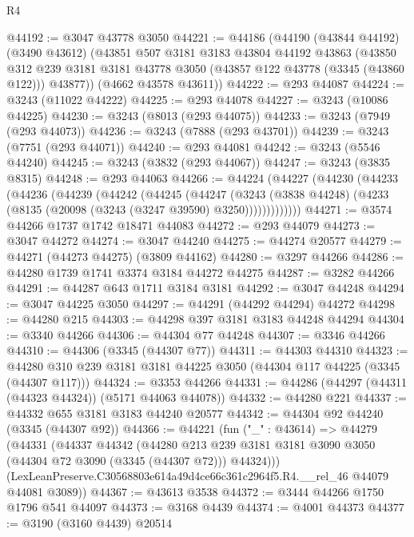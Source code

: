 \begin{lexlean}{R4}
\begin{coremodule}
@44192 := @3047 @43778 @3050
@44221 := @44186
    (@44190
      (@43844 @44192)
      (@3490 @43612)
      (@43851
        @507
        @3181
        @3183
        @43804
        @44192
        @43863
        (@43850
          @312
          @239
          @3181
          @3181
          @43778
          @3050
          (@43857 @122 @43778 (@3345 (@43860 @122)))
          @43877))
      (@4662 @43578 @43611))
@44222 := @293 @44087
@44224 := @3243 (@11022 @44222)
@44225 := @293 @44078
@44227 := @3243 (@10086 @44225)
@44230 := @3243 (@8013 (@293 @44075))
@44233 := @3243 (@7949 (@293 @44073))
@44236 := @3243 (@7888 (@293 @43701))
@44239 := @3243 (@7751 (@293 @44071))
@44240 := @293 @44081
@44242 := @3243 (@5546 @44240)
@44245 := @3243 (@3832 (@293 @44067))
@44247 := @3243 (@3835 @8315)
@44248 := @293 @44063
@44266 := @44224
    (@44227
      (@44230
        (@44233
          (@44236
            (@44239
              (@44242
                (@44245
                  (@44247
                    (@3243
                      (@3838 @44248)
                      (@4233 (@8135 (@20098 (@3243 (@3247 @39590) @3250)))))))))))))
@44271 := @3574 @44266 @1737 @1742 @18471 @44083
@44272 := @293 @44079
@44273 := @3047 @44272
@44274 := @3047 @44240
@44275 := @44274 @20577
@44279 := @44271 (@44273 @44275) (@3809 @44162)
@44280 := @3297 @44266
@44286 := @44280 @1739 @1741 @3374 @3184 @44272 @44275
@44287 := @3282 @44266
@44291 := @44287 @643 @1711 @3184 @3181
@44292 := @3047 @44248
@44294 := @3047 @44225 @3050
@44297 := @44291 (@44292 @44294) @44272
@44298 := @44280 @215
@44303 := @44298 @397 @3181 @3183 @44248 @44294
@44304 := @3340 @44266
@44306 := @44304 @77 @44248
@44307 := @3346 @44266
@44310 := @44306 (@3345 (@44307 @77))
@44311 := @44303 @44310
@44323 := @44280 @310 @239 @3181 @3181 @44225 @3050 (@44304 @117 @44225 (@3345 (@44307 @117)))
@44324 := @3353 @44266
@44331 := @44286 (@44297 (@44311 (@44323 @44324)) (@5171 @44063 @44078))
@44332 := @44280 @221
@44337 := @44332 @655 @3181 @3183 @44240 @20577
@44342 := @44304 @92 @44240 (@3345 (@44307 @92))
@44366 := @44221
    (fun ("_" : @43614) =>
    @44279
      (@44331
        (@44337
          @44342
          (@44280
            @213
            @239
            @3181
            @3181
            @3090
            @3050
            (@44304 @72 @3090 (@3345 (@44307 @72)))
            @44324)))
      (LexLeanPreserve.C30568803e614a49d4ce66c361c2964f5.R4.__rel_46 @44079 @44081 @3089))
@44367 := @43613 @3538
@44372 := @3444 @44266 @1750 @1796 @541 @44097
@44373 := @3168 @4439
@44374 := @4001 @44373
@44377 := @3190 (@3160 @4439) @20514

\end{coremodule}
\end{lexlean}
